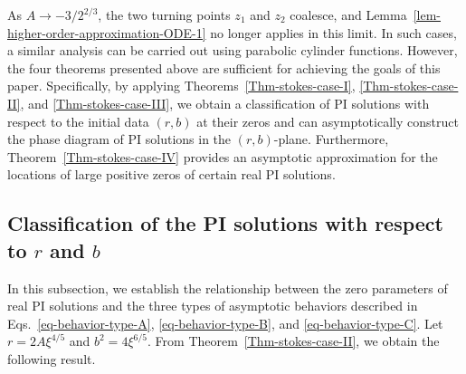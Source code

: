 \documentclass[12pt]{article}
\theoremstyle{plain}
\theoremstyle{definition}
\newtheorem{remark}{\hskip\parindent Remark}
\numberwithin{equation}{section}
\begin{document}
\begin{remark}
As \( A \to -3/2^{2/3} \), the two turning points \( z_{1} \) and \( z_{2} \) coalesce, and Lemma~\ref{lem-higher-order-approximation-ODE-1} no longer applies in this limit. In such cases, a similar analysis can be carried out using parabolic cylinder functions. However, the four theorems presented above are sufficient for achieving the goals of this paper.
Specifically, by applying Theorems~\ref{Thm-stokes-case-I}, \ref{Thm-stokes-case-II}, and \ref{Thm-stokes-case-III}, we obtain a classification of PI solutions with respect to the initial data \( (r, b) \) at their zeros and can asymptotically construct the phase diagram of PI solutions in the \( (r, b) \)-plane. Furthermore, Theorem~\ref{Thm-stokes-case-IV} provides an asymptotic approximation for the locations of large positive zeros of certain real PI solutions.
\end{remark}



\subsection{\texorpdfstring{Classification of the PI solutions with respect to $r$ and $b$}{Classification of the PI solutions with respect to r and b}}

In this subsection, we establish the relationship between the zero parameters of real PI solutions and the three types of asymptotic behaviors described in Eqs.~\eqref{eq-behavior-type-A}, \eqref{eq-behavior-type-B}, and \eqref{eq-behavior-type-C}. Let \( r = 2A\xi^{4/5} \) and \( b^2 = 4\xi^{6/5} \). From Theorem~\ref{Thm-stokes-case-II}, we obtain the following result.
\end{document}
